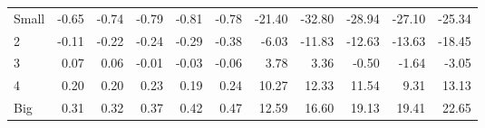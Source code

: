 \begin{table}[!ht]
\begin{tabular}{lrrrrrrrrrr}
    \\
      \cmidrule(r){2-6} \cmidrule(r){7-11}

    Small   & -0.65  & -0.74  & -0.79  & -0.81  & -0.78  & -21.40  & -32.80  & -28.94  & -27.10  & -25.34  \\
         2  & -0.11  & -0.22  & -0.24  & -0.29  & -0.38  & -6.03  & -11.83  & -12.63  & -13.63  & -18.45  \\
         3  & 0.07  & 0.06  & -0.01  & -0.03  & -0.06  & 3.78  & 3.36  & -0.50  & -1.64  & -3.05  \\
         4  & 0.20  & 0.20  & 0.23  & 0.19  & 0.24  & 10.27  & 12.33  & 11.54  & 9.31  & 13.13  \\
    Big     & 0.31  & 0.32  & 0.37  & 0.42  & 0.47  & 12.59  & 16.60  & 19.13  & 19.41  & 22.65  \\

  

  \bottomrule
\end{tabular}
\label{tbl:25_Size_Prior_C1997b}
\end{table}